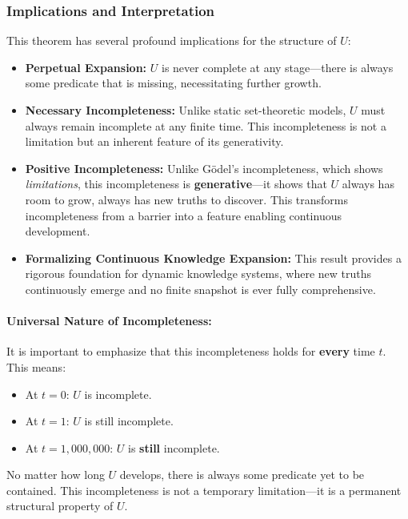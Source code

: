 \documentclass[12pt]{article}
\begin{document}
\subsubsection{Implications and Interpretation}
This theorem has several profound implications for the structure of \( U \):

\begin{itemize}
    \item \textbf{Perpetual Expansion:} \( U \) is never complete at any stage—there is always some predicate that is missing, necessitating further growth.
    \item \textbf{Necessary Incompleteness:} Unlike static set-theoretic models, \( U \) must always remain incomplete at any finite time. This incompleteness is not a limitation but an inherent feature of its generativity.
    \item \textbf{Positive Incompleteness:} Unlike Gödel's incompleteness, which shows \textit{limitations}, this incompleteness is \textbf{generative}—it shows that \( U \) always has room to grow, always has new truths to discover. This transforms incompleteness from a barrier into a feature enabling continuous development.
    \item \textbf{Formalizing Continuous Knowledge Expansion:} This result provides a rigorous foundation for dynamic knowledge systems, where new truths continuously emerge and no finite snapshot is ever fully comprehensive.
\end{itemize}

\paragraph{Universal Nature of Incompleteness:}
It is important to emphasize that this incompleteness holds for \textbf{every} time \( t \). This means:

\begin{itemize}
    \item At \( t=0 \): \( U \) is incomplete.
    \item At \( t=1 \): \( U \) is still incomplete.
    \item At \( t=1{,}000{,}000 \): \( U \) is \textbf{still} incomplete.
\end{itemize}

No matter how long \( U \) develops, there is always some predicate yet to be contained. This incompleteness is not a temporary limitation—it is a permanent structural property of \( U \).
\end{document}

